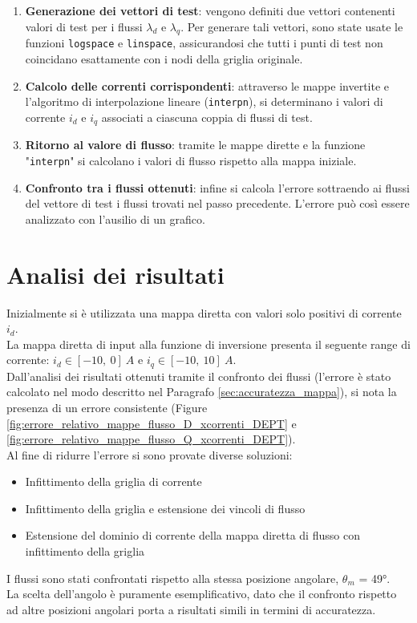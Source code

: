     \begin{enumerate}
    \item \textbf{Generazione dei vettori di test}: vengono definiti due vettori contenenti valori di test per i flussi $\lambda_d$ e $\lambda_q$. Per generare tali vettori, sono state usate le funzioni \texttt{logspace} e \texttt{linspace}, assicurandosi che tutti i punti di test non coincidano esattamente con i nodi della griglia originale.
    \item \textbf{Calcolo delle correnti corrispondenti}: attraverso le mappe invertite e l'algoritmo di interpolazione lineare (\texttt{interpn}), si determinano i valori di corrente $i_d$ e $i_q$ associati a ciascuna coppia di flussi di test.
    \item \textbf{Ritorno al valore di flusso}:  tramite le mappe dirette e la funzione "\texttt{interpn}" si calcolano i valori di flusso rispetto alla mappa iniziale.
    \item \textbf{Confronto tra i flussi ottenuti}: infine si calcola l'errore sottraendo ai flussi del vettore di test i flussi trovati nel passo precedente. L'errore può così essere analizzato con l'ausilio di un grafico.
    \end{enumerate}



\section{Analisi dei risultati}
Inizialmente si è utilizzata una mappa diretta con valori solo positivi di corrente $i_d$.\\ 
La mappa diretta di input alla funzione di inversione presenta il seguente range di corrente: $i_d \in [-10,\ 0] \ A$ e $i_q \in [-10,\ 10] \ A$.\\
Dall'analisi dei risultati ottenuti tramite il confronto dei flussi (l'errore è stato calcolato nel modo descritto nel Paragrafo  \ref{sec:accuratezza_mappa}), si nota la presenza di un errore consistente (Figure \ref{fig:errore_relativo_mappe_flusso_D_xcorrenti_DEPT} e \ref{fig:errore_relativo_mappe_flusso_Q_xcorrenti_DEPT}).\\
Al fine di ridurre l'errore si sono provate diverse soluzioni:
\begin{itemize}
    \item Infittimento della griglia di corrente
    \item Infittimento della griglia e estensione dei vincoli di flusso
    \item Estensione del dominio di corrente della mappa diretta di flusso con infittimento della griglia
\end{itemize}
I flussi sono stati confrontati rispetto alla stessa posizione angolare, $\theta_m$ = 49°.\\ La scelta dell'angolo è puramente esemplificativo, dato che il confronto rispetto ad altre posizioni angolari porta a risultati simili in termini di accuratezza.


